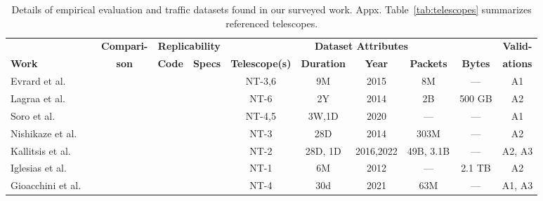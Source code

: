 \documentclass[manuscript,nonacm]{acmart}
\newcommand{\cmark}{\ding{51}}%
\begin{document}
\begin{table*}[h!]
    \small
    \setlength{\tabcolsep}{4pt}
    \caption{Details of empirical evaluation and traffic datasets found in our surveyed work. Appx. Table~\ref{tab:telescopes} summarizes referenced telescopes.}
    \label{tab:eval}
    \begin{tabular}{@{}lccccccccc@{}}
        \toprule
        & \multicolumn{1}{c}{\textbf{Compari-}} 
        & \multicolumn{2}{c}{\bf Replicability} 
        & \multicolumn{5}{c}{\bf Dataset Attributes} 
        & \multicolumn{1}{c}{\textbf{Valid-}} \\
        \cmidrule(lr){3-4} \cmidrule(lr){5-9}
        \textbf{Work} & \textbf{son} & \textbf{Code} & \textbf{Specs} 
        & \textbf{Telescope(s)} & \textbf{Duration} & \textbf{Year} & \textbf{Packets} & \textbf{Bytes} & \textbf{ations} \\
        \midrule

        Evrard et al.~\cite{2019evrard}
        & 
        &  & 
        & NT-3,6
        & 9M & 2015
        & 8M & ---
        & A1 \\

        Lagraa et al.\textbf{~\cite{2019lagraa}}~\cite{2017lagraa}
        &  
        &  & \cmark
        & NT-6
        & 2Y & 2014
        & 2B & 500 GB
        & A2 \\

        Soro et al.\textbf{~\cite{2020soro}}
        &  
        &  & 
        & NT-4,5
        & 3W,1D & 2020
        & --- & ---
        & A1 \\

        Nishikaze et al.~\cite{2015nishikaze}
        &  
        &  & 
        & NT-3
        & 28D & 2014
        & 303M & ---
        & A2 \\

        Kallitsis et al.~\cite{2022kallitsis}
        & \cite{2021gioacchini}
        & \cmark & \cmark
        & NT-2
        & 28D, 1D & 2016,2022
        & 49B, 3.1B & ---
        & A2, A3 \\

        Iglesias et al.~\cite{2019iglesias}
        &  
        &  & \cmark
        & NT-1
        & 6M & 2012
        & --- & 2.1 TB
        & A2 \\

        Gioacchini et al.\textbf{~\cite{2021gioacchini}}~\cite{2023gioacchini}
        & \cite{2020cohen,2017ring}
        & \cmark & \cmark
        & NT-4
        & 30d & 2021
        & 63M & ---
        & A1, A3 \\


\end{tabular}
\end{table*}
\end{document}
